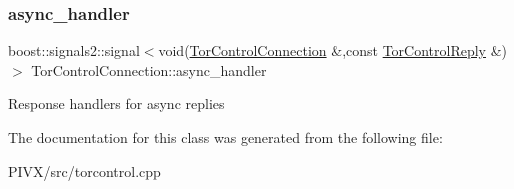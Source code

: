 \subsubsection{\texorpdfstring{async\+\_\+handler}{async\_handler}}
{\footnotesize\ttfamily boost\+::signals2\+::signal$<$void(\mbox{\hyperlink{class_tor_control_connection}{Tor\+Control\+Connection}} \&,const \mbox{\hyperlink{class_tor_control_reply}{Tor\+Control\+Reply}} \&)$>$ Tor\+Control\+Connection\+::async\+\_\+handler}

Response handlers for async replies 

The documentation for this class was generated from the following file\+:\begin{DoxyCompactItemize}
\item 
P\+I\+V\+X/src/torcontrol.\+cpp\end{DoxyCompactItemize}
